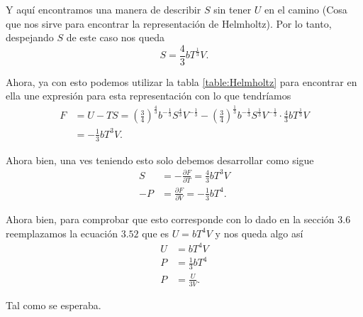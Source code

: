 \documentclass{report}
\begin{document}
Y aquí encontramos una manera de describir $S$ sin tener $U$ en el camino (Cosa que nos sirve para encontrar la representación de Helmholtz). Por lo tanto, despejando $S$ de este caso nos queda \[
  S=\frac{4}{3}bT^{\frac{1}{3}}V
.\] 

Ahora, ya con esto podemos utilizar la tabla \ref{table:Helmholtz} para encontrar en ella une expresión para esta representación con lo que tendríamos 
\begin{align*}
  F&=U-TS=\left( \frac{3}{4} \right)^{\frac{4}{3}}b^{-\frac{1}{3}}S^{\frac{4}{3}}V^{-\frac{1}{3}}-\left( \frac{3}{4} \right)^{\frac{1}{3}}b^{-\frac{1}{3}}S^{\frac{1}{3}}V^{-\frac{1}{3}}\cdot\frac{4}{3}bT^{\frac{1}{3}}V\\
  &= -\frac{1}{3}bT^3V
.\end{align*}

Ahora bien, una ves teniendo esto solo debemos desarrollar como sigue
\begin{align*}
  S &= -\frac{\partial F}{\partial T}=\frac{4}{3}bT^3V \\
  -P &= \frac{\partial F}{\partial V} =-\frac{1}{3}bT^4
.\end{align*}

Ahora bien, para comprobar que esto corresponde con lo dado en la sección $3.6$ reemplazamos la ecuación $3.52$ que es $U=bT^4V$ y nos queda algo así
\begin{align*}
  U &= bT^4V \\
  P &= \frac{1}{3}bT^4 \\
  P &= \frac{U}{3V} 
.\end{align*}

Tal como se esperaba.

\sol
\end{document}
